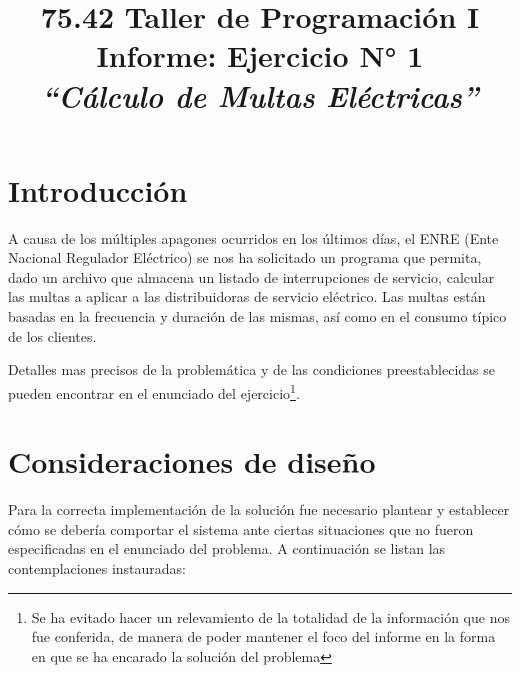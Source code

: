 \documentclass{article}
\begin{document}
\title{\Large 75.42 Taller de Programación I \\ 
	  \medskip\Huge Informe: Ejercicio N° 1  \\
	  \bigskip\Large\textit{``Cálculo de Multas Eléctricas''}}
\date{}
\maketitle




\section{Introducción}

	A causa de los múltiples apagones ocurridos en los últimos días, el ENRE (Ente Nacional Regulador Eléctrico) se nos ha solicitado un programa que permita, dado un archivo que almacena un listado de interrupciones de servicio, calcular las multas a aplicar a las distribuidoras de servicio eléctrico. Las multas están basadas en la frecuencia y duración de las mismas, así como en el consumo típico de los clientes.
	\par
	Detalles mas precisos de la problemática y de las condiciones preestablecidas se pueden encontrar en el enunciado del ejercicio\footnote{Se ha evitado hacer un relevamiento de la totalidad de la información que nos fue conferida, de manera de poder mantener el foco del informe en la forma en que se ha encarado la solución del problema}.
\bigskip




\section{Consideraciones de diseño}

	Para la correcta implementación de la solución fue necesario plantear y establecer cómo se debería comportar el sistema ante ciertas situaciones que no fueron especificadas en el enunciado del problema. A continuación se listan las contemplaciones instauradas:
\end{document}
